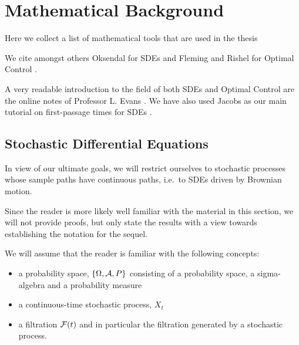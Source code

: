 \chapter{Mathematical Background}
\label{ch:math_background}

Here we collect a list of mathematical tools that are used in the thesis

We cite amongst others Oksendal for SDEs \cite{Oksendal2007} and Fleming and
Rishel for Optimal Control \cite{Fleming1975}.

A very readable introduction to the field of both SDEs and Optimal Control are
the online notes of Professor L. Evans \cite{Evansa,Evansb}. We have also used
Jacobs as our main tutorial on first-passage times for SDEs \cite{Jacobs}. 
 
\section{Stochastic Differential Equations}
\label{sec:SDEs}
In view of our ultimate goals, we will restrict ourselves to  stochastic
processes whose sample paths have continuous paths, i.e.\ to SDEs driven by
Brownian motion.  

Since the reader is more likely well familiar with the material in this section,
we will not provide proofs, but only state the results with a view towards
establishing the notation for the sequel.

We will assume that the reader is familiar with the following concepts:
\begin{itemize} 
  \item a probability space, $\{{\Omega}, { \mathcal{A} }, P\}$ consisting of a
  probability space, a sigma-algebra and a probability measure
  \item a continuous-time stochastic process, $X_t$
  \item a filtration ${\mathcal{F}}(t)$ and in particular the filtration generated by a
  stochastic process.
\end{itemize}

